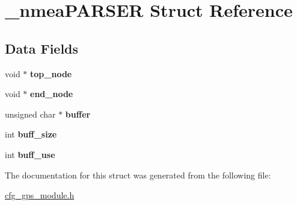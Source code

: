 \hypertarget{struct__nmea_p_a_r_s_e_r}{}\section{\+\_\+nmea\+P\+A\+R\+S\+ER Struct Reference}
\label{struct__nmea_p_a_r_s_e_r}
\subsection*{Data Fields}
\begin{DoxyCompactItemize}
\item 
\mbox{\label{struct__nmea_p_a_r_s_e_r_a7a0d12f9407ca05d217f7340acbf94b6}} 
void $\ast$ {\bfseries top\+\_\+node}
\item 
\mbox{\label{struct__nmea_p_a_r_s_e_r_a1b5f5310873908b080ef93b249e30179}} 
void $\ast$ {\bfseries end\+\_\+node}
\item 
\mbox{\label{struct__nmea_p_a_r_s_e_r_a70e7ad2e1a45c8db5fba9ad4778bd400}} 
unsigned char $\ast$ {\bfseries buffer}
\item 
\mbox{\label{struct__nmea_p_a_r_s_e_r_ac11d414db84dee14d06826e54d888820}} 
int {\bfseries buff\+\_\+size}
\item 
\mbox{\label{struct__nmea_p_a_r_s_e_r_a76f2fa3871a6978c7f0eceea92c6ff13}} 
int {\bfseries buff\+\_\+use}
\end{DoxyCompactItemize}


The documentation for this struct was generated from the following file\+:\begin{DoxyCompactItemize}
\item 
\hyperlink{cfg__gps__module_8h}{cfg\+\_\+gps\+\_\+module.\+h}\end{DoxyCompactItemize}

